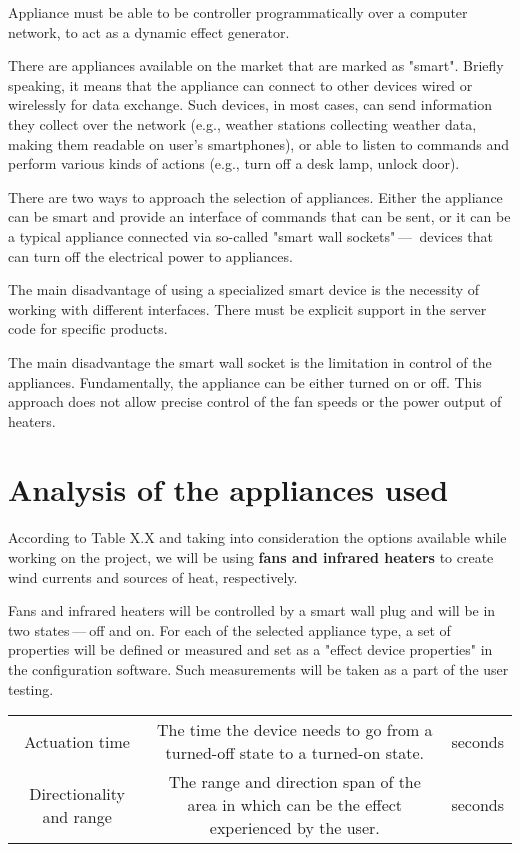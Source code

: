 Appliance must be able to be controller programmatically over a computer network,
to act as a dynamic effect generator.


There are appliances available on the market that are marked as "smart".
Briefly speaking, it means that the appliance
can connect to other devices wired or wirelessly for data exchange. \cite{wisd}
Such devices, in most cases, can send information they collect over
the network (e.g., weather stations collecting weather data, making them readable
on user’s smartphones), or able to listen to commands and perform various
kinds of actions (e.g., turn off a desk lamp, unlock door).


There are two ways to approach the selection of appliances. Either the
appliance can be smart and provide an interface of commands that can be sent, or
it can be a typical appliance connected via so-called "smart wall sockets" — 
devices that can turn off the electrical power to appliances.


The main disadvantage of using a specialized smart device is the necessity of
working with different interfaces. There must be explicit
support in the server code for specific products.


The main disadvantage the smart wall socket is the limitation in
control of the appliances. Fundamentally, the appliance can be either turned on or off.
This approach does not allow precise control of the fan speeds or the power output
of heaters.


\hypertarget{x-analysis-of-the-appliances-used}{\section{Analysis of the appliances used}}
According to Table X.X and taking into consideration the
options available while working on the project, we will be using \textbf{fans
and infrared heaters}
to create wind currents and sources of heat, respectively.


Fans and infrared heaters will be controlled by a smart wall plug
and will be in two states — off and on. For each of the selected appliance
type, a set of properties will be defined
or measured and set as a "effect device properties" in the configuration
software. Such measurements will be taken as a part of the user testing.


\begin{center}
\begin{tabular}{|c|c|c|}
\hline
Actuation time & The time the device needs to go from a turned-off state to
  a turned-on state. & seconds \\ 
Directionality and range & The range and direction span of the area in
  which can be the effect experienced by the user. & seconds \\ 
\hline
\end{tabular}
\end{center}

